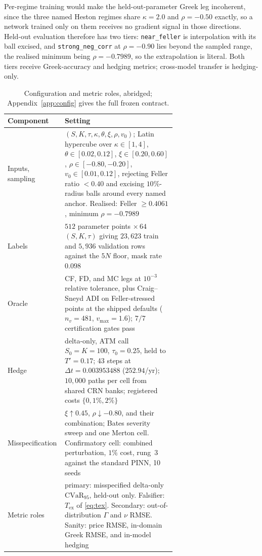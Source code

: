 \documentclass[10pt]{article}
\begin{document}
Per-regime training would make the held-out-parameter Greek leg incoherent, since
the three named Heston regimes share $\kappa=2.0$ and $\rho=-0.50$ exactly, so a
network trained only on them receives no gradient signal in those directions.
Held-out evaluation therefore has two tiers: \texttt{near\_feller} is interpolation
with its ball excised, and \texttt{strong\_neg\_corr} at $\rho=-0.90$ lies beyond
the sampled range, the realised minimum being $\rho=-0.7989$, so the extrapolation
is literal. Both tiers receive Greek-accuracy and hedging metrics; cross-model
transfer is hedging-only.

\begin{table}[!htbp]
\centering\footnotesize\setlength{\tabcolsep}{4pt}
\begin{tabular}{@{}lp{0.66\linewidth}@{}}
\toprule
Component & Setting \\
\midrule
Inputs, sampling & $(S, K, \tau, \kappa, \theta, \xi, \rho, v_0)$; Latin hypercube over $\kappa\in[1,4]$, $\theta\in[0.02,0.12]$, $\xi\in[0.20,0.60]$, $\rho\in[-0.80,-0.20]$, $v_0\in[0.01,0.12]$, rejecting Feller ratio $<0.40$ and excising $10\%$-radius balls around every named anchor. Realised: Feller $\geq 0.4061$, minimum $\rho=-0.7989$ \\
Labels & $512$ parameter points $\times\,64$ $(S,K,\tau)$ giving $23{,}623$ train and $5{,}936$ validation rows against the $5N$ floor, mask rate $0.098$ \\
Oracle & CF, FD, and MC legs at $10^{-3}$ relative tolerance, plus Craig--Sneyd ADI on Feller-stressed points at the shipped defaults ($n_v{=}481$, $v_{\max}{=}1.6$); $7/7$ certification gates pass \\
Hedge & delta-only, ATM call $S_0{=}K{=}100$, $\tau_0{=}0.25$, held to $T'{=}0.17$; 43 steps at $\Delta t = 0.003953488$ ($252.94$/yr); $10{,}000$ paths per cell from shared CRN banks; registered costs $\{0,1\%,2\%\}$ \\
Misspecification & $\xi{\uparrow}0.45$, $\rho{\downarrow}{-}0.80$, and their combination; Bates severity sweep and one Merton cell. Confirmatory cell: combined perturbation, $1\%$ cost, rung~3 against the standard PINN, 10 seeds \\
Metric roles & primary: misspecified delta-only $\mathrm{CVaR}_{95}$, held-out only. Falsifier: $T_{\mathrm{ex}}$ of \eqref{eq:tex}. Secondary: out-of-distribution $\Gamma$ and $\nu$ RMSE. Sanity: price RMSE, in-domain Greek RMSE, and in-model hedging \\
\bottomrule
\end{tabular}
\caption{Configuration and metric roles, abridged; Appendix~\ref{app:config} gives
the full frozen contract.}
\label{tab:config}
\end{table}
\end{document}
